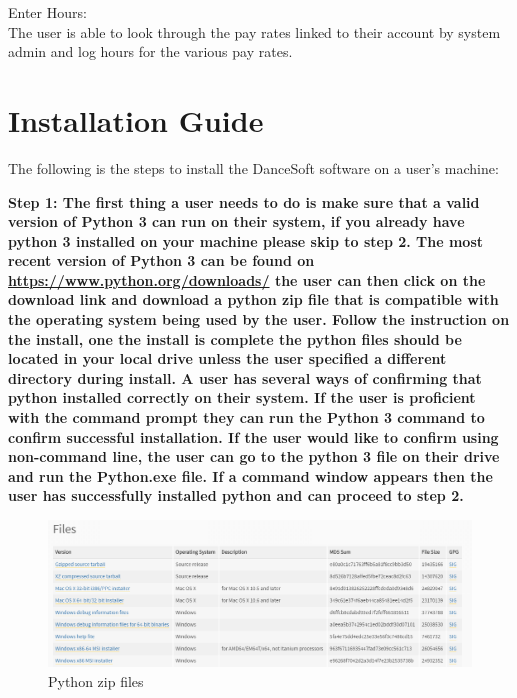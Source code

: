 Enter Hours:\\
The user is able to look through the pay rates linked to their account by system admin and log hours for the various pay rates.


\section{Installation Guide}
The following is the steps to install the DanceSoft software on a user's machine:

\bf Step 1: \rm
	The first thing a user needs to do is make sure that a valid version of Python 3 can run on their system, if you already have python 3 installed on your machine please skip to step 2.
	The most recent version of Python 3 can be found on \url{https://www.python.org/downloads/} the user can then click on the download link and download a python zip file that is compatible with the operating system being used by the user.
	Follow the instruction on the install, one the install is complete the python files should be located in your local drive unless the user specified a different directory during install. A user has several ways of confirming that python installed correctly on their system. If the user is proficient with the command prompt they can run the Python 3 command to confirm successful installation. If the user would like to confirm using non-command line, the user can go to the python 3 file on their drive and run the Python.exe file. If a command window appears then the user has successfully installed python and can proceed to step 2.
	
\begin{figure}
  \includegraphics[width=\linewidth]{pics/pythonFiles.png}
  \caption{Python zip files}
  \label{fig:User doc: python files}
\end{figure}

